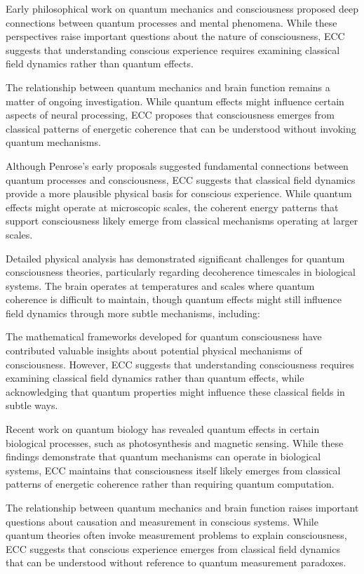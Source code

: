 Early philosophical work on quantum mechanics and consciousness \cite{Bohm1990} proposed deep connections between quantum processes and mental phenomena. While these perspectives raise important questions about the nature of consciousness, ECC suggests that understanding conscious experience requires examining classical field dynamics rather than quantum effects.

The relationship between quantum mechanics and brain function \cite{Koch2006} remains a matter of ongoing investigation. While quantum effects might influence certain aspects of neural processing, ECC proposes that consciousness emerges from classical patterns of energetic coherence that can be understood without invoking quantum mechanisms.

Although Penrose's early proposals \cite{Penrose1989, Penrose1994} suggested fundamental connections between quantum processes and consciousness, ECC suggests that classical field dynamics provide a more plausible physical basis for conscious experience. While quantum effects might operate at microscopic scales, the coherent energy patterns that support consciousness likely emerge from classical mechanisms operating at larger scales.

Detailed physical analysis \cite{Tegmark2000} has demonstrated significant challenges for quantum consciousness theories, particularly regarding decoherence timescales in biological systems. The brain operates at temperatures and scales where quantum coherence is difficult to maintain, though quantum effects might still influence field dynamics through more subtle mechanisms, including:

The mathematical frameworks developed for quantum consciousness \cite{Hagan2002} have contributed valuable insights about potential physical mechanisms of consciousness. However, ECC suggests that understanding consciousness requires examining classical field dynamics rather than quantum effects, while acknowledging that quantum properties might influence these classical fields in subtle ways.

Recent work on quantum biology \cite{Koch2006} has revealed quantum effects in certain biological processes, such as photosynthesis and magnetic sensing. While these findings demonstrate that quantum mechanisms can operate in biological systems, ECC maintains that consciousness itself likely emerges from classical patterns of energetic coherence rather than requiring quantum computation.

The relationship between quantum mechanics and brain function \cite{Stapp2009} raises important questions about causation and measurement in conscious systems. While quantum theories often invoke measurement problems to explain consciousness, ECC suggests that conscious experience emerges from classical field dynamics that can be understood without reference to quantum measurement paradoxes.

